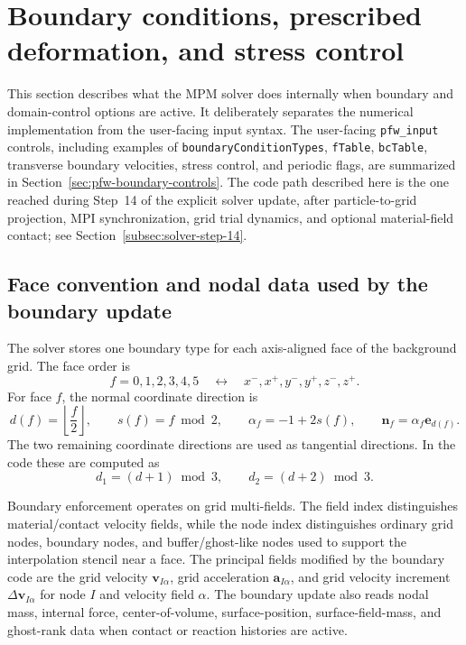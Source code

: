\section{Boundary conditions, prescribed deformation, and stress control}
\label{sec:bc-internals}

This section describes what the MPM solver does internally when boundary and domain-control options are active.  It deliberately separates the numerical implementation from the user-facing input syntax.  The user-facing \texttt{pfw\_input} controls, including examples of \texttt{boundaryConditionTypes}, \texttt{fTable}, \texttt{bcTable}, transverse boundary velocities, stress control, and periodic flags, are summarized in Section~\ref{sec:pfw-boundary-controls}.  The code path described here is the one reached during Step~14 of the explicit solver update, after particle-to-grid projection, MPI synchronization, grid trial dynamics, and optional material-field contact; see Section~\ref{subsec:solver-step-14}.

\subsection{Face convention and nodal data used by the boundary update}
\label{subsec:bc-face-convention}

The solver stores one boundary type for each axis-aligned face of the background grid.  The face order is
\begin{equation}
  f=0,1,2,3,4,5
  \quad\leftrightarrow\quad
  x^-,x^+,y^-,y^+,z^-,z^+.
\end{equation}
For face $f$, the normal coordinate direction is
\begin{equation}
  d(f)=\left\lfloor \frac{f}{2}\right\rfloor,
  \qquad
  s(f)=f\bmod 2,
  \qquad
  \alpha_f=-1+2s(f),
  \qquad
  \mathbf{n}_f=\alpha_f\mathbf{e}_{d(f)}.
  \label{eq:bc-face-normal}
\end{equation}
The two remaining coordinate directions are used as tangential directions.  In the code these are computed as
\begin{equation}
  d_1=(d+1)\bmod 3,
  \qquad
  d_2=(d+2)\bmod 3.
\end{equation}

Boundary enforcement operates on grid multi-fields.  The field index distinguishes material/contact velocity fields, while the node index distinguishes ordinary grid nodes, boundary nodes, and buffer/ghost-like nodes used to support the interpolation stencil near a face.  The principal fields modified by the boundary code are the grid velocity $\mathbf{v}_{I\alpha}$, grid acceleration $\mathbf{a}_{I\alpha}$, and grid velocity increment $\Delta\mathbf{v}_{I\alpha}$ for node $I$ and velocity field $\alpha$.  The boundary update also reads nodal mass, internal force, center-of-volume, surface-position, surface-field-mass, and ghost-rank data when contact or reaction histories are active.

